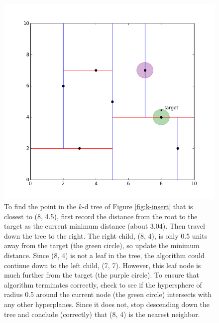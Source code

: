 \begin{figure}[H]
\includegraphics[width=.9\textwidth]{figures/kdpic3.png}
\caption{To find the point in the $k$-d tree of Figure \ref{fig:k-insert} that is closest to (8, 4.5), first record the distance from the root to the target as the current minimum distance (about 3.04). Then travel down the tree to the right. The right child, (8, 4), is only 0.5 units away from the target (the green circle), so update the minimum distance. Since (8, 4) is not a leaf in the tree, the algorithm could continue down to the left child, (7, 7). However, this leaf node is much further from the target (the purple circle). To ensure that algorithm terminates correctly, check to see if the hypersphere of radius 0.5 around the current node (the green circle) intersects with any other hyperplanes. Since it does not, stop descending down the tree and conclude (correctly) that (8, 4) is the nearest neighbor.}
\label{fig:bad-search}
\end{figure}

